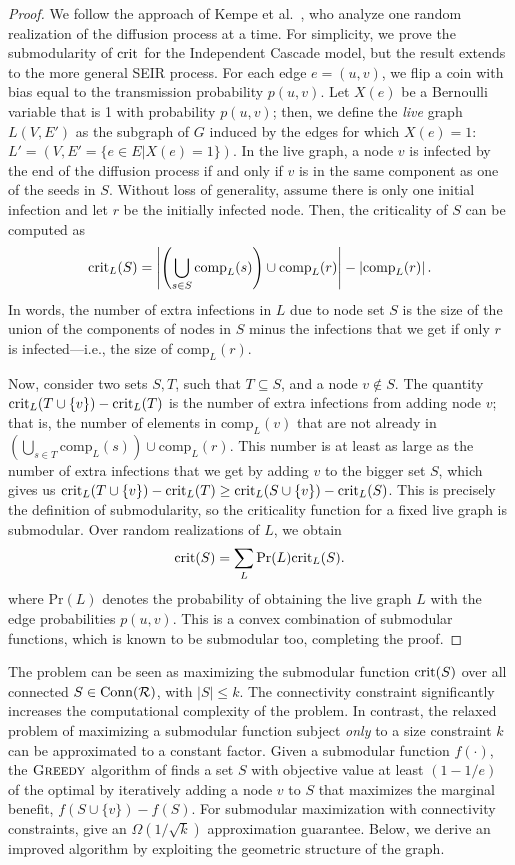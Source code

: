 \begin{proof}
We follow the approach of Kempe et al.\ \cite{kempe:sigkdd03}, who analyze one random realization of the diffusion process at a time. For simplicity, we prove the submodularity of $\text{crit}$ for the Independent Cascade model, but the result extends to the more general SEIR process. For each edge $e=(u,v)$, we flip a coin with bias equal to the transmission probability $p(u,v)$. Let $X(e)$ be a Bernoulli variable that is 1 with probability $p(u,v)$; then, we define the \emph{live} graph $L(V, E')$ as the subgraph of $G$ induced by the edges for which $X(e) = 1$: $L' = (V, E'=\{e \in E | X(e) = 1\})$. In the live graph, a node $v$ is infected by the end of the diffusion process if and only if $v$ is in the same component as one of the seeds in $S$. Without loss of generality, assume there is only one initial infection and let $r$ be the initially infected node. Then, the criticality of $S$ can be computed as
$$
\text{crit}_L(S) = \left|\left(\bigcup_{s \in S} \text{comp}_L(s)\right) \cup \text{comp}_L(r)\right| - \left|\text{comp}_L(r)\right|.
$$
In words, the number of extra infections in $L$ due to node set $S$ is the size of the union of the components of nodes in $S$ minus the infections that we get if only $r$ is infected---i.e., the size of $\text{comp}_L(r)$.

Now, consider two sets $S,T$, such that $T\subseteq S$, and a node $v \not \in S$. The quantity $\text{crit}_L(T \cup \{v\}) - \text{crit}_L(T)$ is the number of extra infections from adding node $v$; that is, the number of elements in $\text{comp}_L(v)$ that are not already in $(\bigcup_{s \in T} \text{comp}_L(s)) \cup \text{comp}_L(r)$. This number is at least as large as the number of extra infections that we get by adding $v$ to the bigger set $S$, which gives us $\text{crit}_L(T \cup \{v\}) - \text{crit}_L(T) \geq \text{crit}_L(S \cup \{v\}) - \text{crit}_L(S)$. This is precisely the definition of submodularity, so the criticality function for a fixed live graph is submodular. Over random realizations of $L$, we obtain
$$
\text{crit}(S) = \sum_{L}\text{Pr}(L) \text{crit}_L(S).
$$
where $\text{Pr}(L)$ denotes the probability of obtaining the live graph $L$ with the edge probabilities $p(u,v)$. This is a convex combination of submodular functions, which is known to be submodular too, completing the proof.
\end{proof}

The \maxcrit{} problem can be seen as maximizing the submodular function $\text{crit}(S)$ over all connected $S\in\text{Conn}(\mathcal{R})$, with $|S|\leq k$. The connectivity constraint significantly increases the computational complexity of the problem. In contrast, the relaxed problem of maximizing a submodular function subject \emph{only} to a size constraint $k$ can be approximated to a constant factor. Given a submodular function $f(\cdot)$, the $\textsc{Greedy}{}$ algorithm of \cite{nemhauser1978analysis} finds a set $S$ with objective value at least $(1 - 1/e)$ of the optimal by iteratively adding a node $v$ to $S$ that maximizes the marginal benefit, $f(S\cup\{v\}) - f(S)$.
For submodular maximization with connectivity constraints, \cite{kuo2015maximizing} give an $\Omega(1/\sqrt{k})$ approximation guarantee. Below, we derive an improved algorithm by exploiting the geometric structure of the graph.

